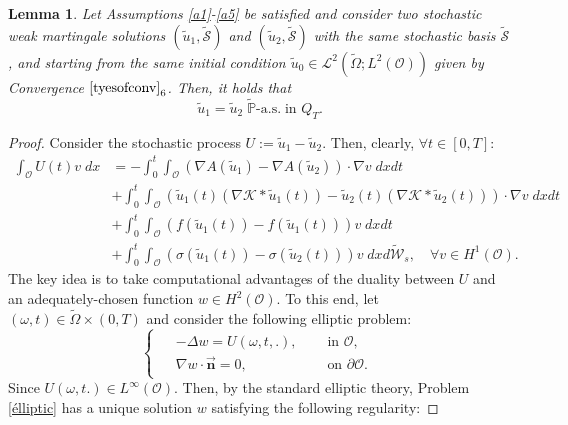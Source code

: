 \documentclass[10pt,number,preprint,times]{elsarticle}
\numberwithin{equation}{section} %
\newtheorem{lem}{Lemma}[section]
\begin{document}
\begin{lem}
	Let Assumptions \ref{a1}-\ref{a5} be satisfied and consider two stochastic weak martingale solutions $\left(\tilde{u}_1,\tilde{\mathcal{S}}\right)$ and $\left(\tilde{u}_2,\tilde{\mathcal{S}}\right)$ with the same stochastic basis $\tilde{\mathcal{S}}$, and starting from the same initial condition $\tilde{u}_0 \in \mathcal{L}^2(\tilde{\Omega};L^2(\mathcal{O}))$ given by Convergence $\eqref{tyesofconv}_6$. Then, it holds that
	$$
	\tilde{u}_1=\tilde{u}_2 \; \tilde{\mathbb{P}}\text{-a.s.} \; \text{in } {Q}_T.
	$$
\end{lem}
\begin{proof}
Consider the stochastic process $U:=\tilde{u}_1-\tilde{u}_2$. Then, clearly, $\forall t \in [0,T]:$
\begin{equation}\label{diff}
	\begin{split}
		\int_\mathcal{O} U(t)v\; dx&=- \int_{0}^t \int_{\mathcal{O}} \left(\nabla A(\tilde{u}_1)-\nabla A(\tilde{u}_2)\right) \cdot \nabla v\; dxdt\\
		&+\int_{0}^t \int_{\mathcal{O}} \left(\tilde{u}_1(t)\left(\nabla \mathcal{K} \ast \tilde{u}_1(t)\right)-\tilde{u}_2(t)\left(\nabla \mathcal{K} \ast \tilde{u}_2(t)\right)\right) \cdot \nabla v\; dxdt\\
		&+\int_{0}^t \int_{\mathcal{O}} \left(f(\tilde{u}_1(t))-f(\tilde{u}_1(t))\right)v\; dxdt\\
		&+\int_{0}^t \int_{\mathcal{O}} \left(\sigma(\tilde{u}_1(t))-\sigma(\tilde{u}_2(t))\right)v\; dx d\tilde{\mathcal{W}}_s, \quad \forall v \in H^1(\mathcal{O}). \; 
	\end{split}
\end{equation}
The key idea is to take computational advantages of the duality between $U$ and an adequately-chosen function $w \in H^2(\mathcal{O})$. To this end, let $(\omega,t) \in \tilde{\Omega}  \times (0,T)$ and consider the following elliptic problem:
\begin{equation}\label{élliptic}
	\begin{cases}
	\begin{split}
		&-\Delta w=U(\omega,t,.), \quad &\text{ in } \mathcal{O},\\
		&\nabla w \cdot \overrightarrow{\textbf{n}}=0, &\text{ on } \partial \mathcal{O}. 
	\end{split}
	\end{cases}
\end{equation}
Since $U(\omega,t.) \in L^\infty(\mathcal{O})$. Then, by the standard elliptic theory, Problem \eqref{élliptic} has a unique solution $w$ satisfying the following regularity:

\end{proof}
\end{document}
